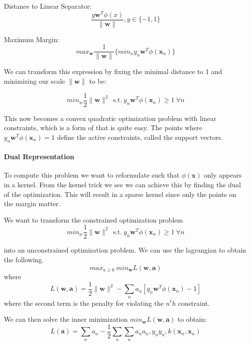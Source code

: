 \documentclass[12pt]{article}
\begin{document}
            Distance to Linear Separator:
            $$ \frac{y\boldsymbol{w}^T\phi(x)}{\|\boldsymbol{w}\|}, y \in \{-1, 1\} $$

            Maximum Margin:
            $$ max_{\boldsymbol{w}} \frac{1}{\|\boldsymbol{w}\|} \{min_n y_n
            \boldsymbol{w}^T\phi(\boldsymbol{x}_n)\} $$

            We can transform this expression by fixing the minimal distance to 1 and minimizing our scale
            $\|\boldsymbol{w}\|$ to be:

            $$ min_w \frac{1}{2} \|\boldsymbol{w}\|^2 \ \ \text{s.t.} \  y_n \boldsymbol{w}^T\phi(\boldsymbol{x}_n)
            \geq 1 \ \forall n $$

            This now becomes a convex quadratic optimization problem with linear constraints, which is a form of
            that is quite easy. The points where $y_n \boldsymbol{w}^T\phi(\boldsymbol{x}_n) = 1$ define the active
            constraints, called the support vectors.

            \paragraph{Dual Representation}
                To compute this problem we want to reformulate such that $\phi(\boldsymbol{x})$ only appears in a
                kernel. From the kernel trick we see we can achieve this by finding the dual of the optimization.
                This will result in a sparse kernel since only the points on the margin matter.

                We want to transform the constrained optimization problem
                $$ min_w \frac{1}{2} \|\boldsymbol{w}\|^2 \ \ \text{s.t.} \  y_n
                \boldsymbol{w}^T\phi(\boldsymbol{x}_n) \geq 1 \ \forall n $$

                into an unconstrained optimization problem. We can use the lagrangian to obtain the following.
                $$ max_{a \geq 0} \ min_{\boldsymbol{w}} L(\boldsymbol{w}, \boldsymbol{a}) $$
                where
                $$ L(\boldsymbol{w}, \boldsymbol{a}) = \frac{1}{2} \| \boldsymbol{w} \|^2 - \sum_n a_n[y_n
                \boldsymbol{w}^T \phi(\boldsymbol{x}_n) - 1] $$
                where the second term is the penalty for violating the $n^th$ constraint.

                We can then solve the inner minimization $min_{\boldsymbol{w}}L(\boldsymbol{w}, \boldsymbol{a})$ to
                obtain:
                $$L(\boldsymbol{a}) = \sum_n a_n - \frac{1}{2}\sum_n \sum_n a_n a_n, y_n y_n, k(\boldsymbol{x}_n, \boldsymbol{x}_n)$$
\end{document}
